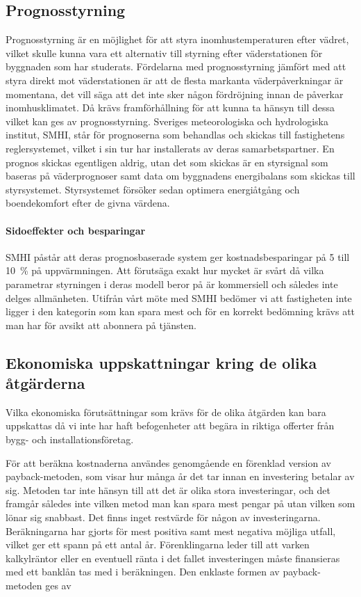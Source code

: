\subsection{Prognosstyrning}
Prognosstyrning är en möjlighet för att styra inomhustemperaturen efter vädret, vilket skulle kunna vara ett alternativ till styrning efter väderstationen för byggnaden som har studerats.
Fördelarna med prognosstyrning jämfört med att styra direkt mot väderstationen är att de flesta markanta väderpåverkningar är momentana, det vill säga att det inte sker någon fördröjning innan de påverkar inomhusklimatet. Då krävs framförhållning för att kunna ta hänsyn till dessa vilket kan ges av prognosstyrning. Sveriges meteorologiska och hydrologiska institut, SMHI, står för prognoserna som behandlas och skickas till fastighetens reglersystemet, vilket i sin tur har installerats av deras samarbetspartner. En prognos skickas egentligen aldrig, utan det som skickas är en styrsignal som baseras på väderprognoser samt data om byggnadens energibalans som skickas till styrsystemet. Styrsystemet försöker sedan optimera energiåtgång och boendekomfort efter de givna värdena.

\paragraph{Sidoeffekter och besparingar}
SMHI påstår att deras prognosbaserade system ger kostnadsbesparingar på 5 till 10~\% på uppvärmningen. Att förutsäga exakt hur mycket är svårt då vilka parametrar styrningen i deras modell beror på är kommersiell och således inte delges allmänheten. Utifrån vårt möte med SMHI bedömer vi att fastigheten inte ligger i den kategorin som kan spara mest och för en korrekt bedömning krävs att man har för avsikt att abonnera på tjänsten.

\subsection{Ekonomiska uppskattningar kring de olika åtgärderna}
Vilka ekonomiska förutsättningar som krävs för de olika åtgärden kan bara uppskattas då vi inte har haft befogenheter att begära in riktiga offerter från bygg- och installationsföretag.

För att beräkna kostnaderna användes genomgående en förenklad version av payback-metoden, som visar hur många år det tar innan en investering betalar av sig. Metoden tar inte hänsyn till att det är olika stora investeringar, och det framgår således inte vilken metod man kan spara mest pengar på utan vilken som lönar sig snabbast. Det finns inget restvärde för någon av investeringarna. Beräkningarna har gjorts för mest positiva samt mest negativa möjliga utfall, vilket ger ett spann på ett antal år. Förenklingarna leder till att varken kalkylräntor eller en eventuell ränta i det fallet investeringen måste finansieras med ett banklån tas med i beräkningen. Den enklaste formen av payback-metoden ges av

